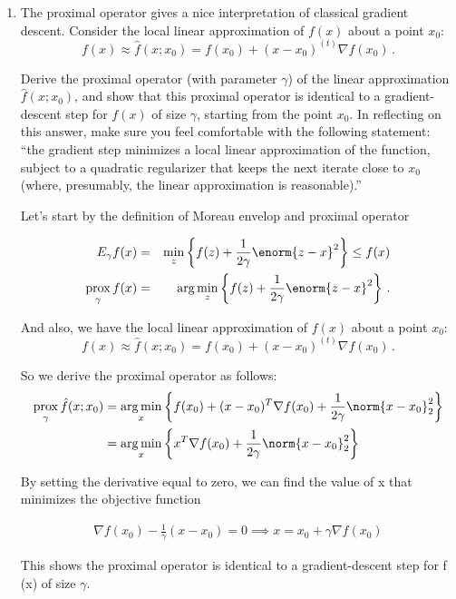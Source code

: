 \documentclass{article}
\DeclareMathOperator*{\argmin}{arg\,min}
\DeclareMathOperator*{\prox}{prox}
\begin{document}
\begin{enumerate}[label=(\Alph*)]
\item
The proximal operator gives a nice interpretation of classical gradient descent.  Consider the local linear approximation of $f(x)$ about a point $x_0$:
$$
f(x) \approx \hat{f}(x; x_0) = f(x_0) + (x - x_0)^{(t)} \nabla f(x_0) \, .
$$

Derive the proximal operator (with parameter $\gamma$) of the linear approximation $\hat{f}(x; x_0)$, and show that this proximal operator is identical to a gradient-descent step for $f(x)$ of size $\gamma$, starting from the point $x_0$.  In reflecting on this answer, make sure you feel comfortable with the following statement: ``the gradient step minimizes a local linear approximation of the function, subject to a quadratic regularizer that keeps the next iterate close to $x_0$ (where, presumably, the linear approximation is reasonable).''


{\color{blue}

Let's start by the definition of Moreau envelop and proximal operator

\begin{eqnarray}
E_{\gamma} f(x) &=& \min_{z } \left\{f(z) + \frac{1}{2\gamma} \enorm{z - x}^2  \right\}  \leq f(x) \\
\prox_{\gamma} f(x) &=& \arg \min_{z } \left\{  f(z)+ \frac{1}{2\gamma} \enorm{z - x}^2  \right\} \, .
\end{eqnarray}

And also, we have the local linear approximation of $f(x)$ about a point $x_0$:
$$
f(x) \approx \hat{f}(x; x_0) = f(x_0) + (x - x_0)^{(t)} \nabla f(x_0) \, .
$$


So we derive the proximal operator as follows:
\begin{align}
\prox_\gamma \hat{f}(x;x_0) &= \argmin_x \left \{ f(x_0) + (x - x_0)^T\nabla f(x_0) + \frac{1}{2\gamma} \norm{x-x_0}_2^2  \right \} \\
&= \argmin_x \left \{ x^T \nabla f(x_0) + \frac{1}{2\gamma} \norm{x-x_0}_2^2  \right \}
\end{align}

By setting the derivative equal to zero, we can find the value of x that minimizes the objective function

\begin{align}
	\nabla f(x_0) - \frac{1}{\gamma}(x-x_0) = 0
	\implies x = x_0 + \gamma \nabla f(x_0)
\end{align}

 This shows the proximal operator is identical to a gradient-descent step for f (x) of size $\gamma$.

}
\end{enumerate}
\end{document}
